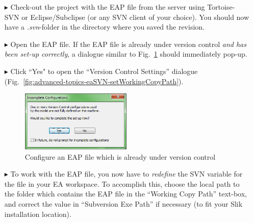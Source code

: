 \begin{enumerate}
  \item[$\blacktriangleright$] Check-out the project with the EAP file from the server using Tortoise-SVN or Eclipse/Subclipse (or any SVN client of your choice). 
  You should now have a \textit{.svn}-folder in the directory where you saved the revision.
  \item[$\blacktriangleright$] Open the EAP file.
  If the EAP file is already under version control \emph{and has been set-up correctly}, a dialogue similar to Fig.~\ref{fig:advanced-topics-eaSVN-incompleteConf} should immediately pop-up. 
  \item[$\blacktriangleright$] Click ``Yes" to open the ``Version Control Settings'' dialogue (Fig.~\ref{fig:advanced-topics-eaSVN-setWorkingCopyPath}).
\begin{figure}[!htbp]
\begin{center}
	\includegraphics[width=0.5\textwidth]{pics/advancedTopics/eaSVN/DemoLanguages/011}
	\caption{Configure an EAP file which is already under version control}
  	\label{fig:advanced-topics-eaSVN-incompleteConf}
\end{center}
\end{figure}

   \item[$\blacktriangleright$] To work with the EAP file, you now have to \emph{redefine} the SVN variable for the file in your EA workspace. 
   To accomplish this, choose the local path to the folder which contains the EAP file in the ``Working Copy Path'' text-box, and correct the value in ``Subversion Exe Path'' if necessary (to fit your Slik installation location).


\end{enumerate}
